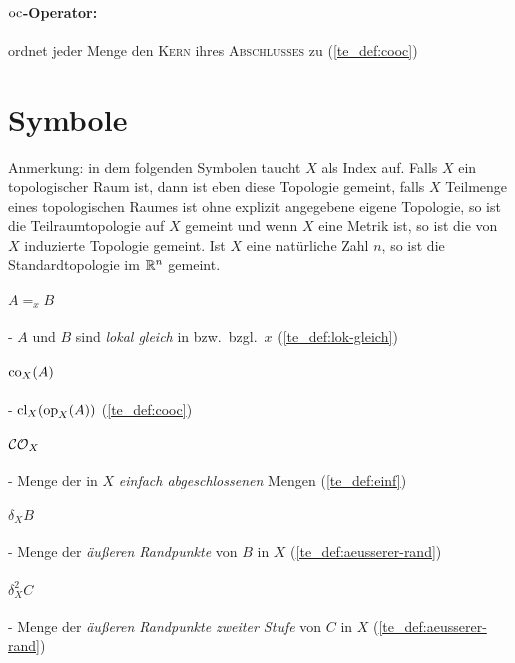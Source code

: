    \paragraph{$\text{oc}$-Operator:} ordnet jeder Menge den \textsc{Kern} ihres \textsc{Abschlusses} zu (\ref{te_def:cooc})
    
   
\section*{Symbole}

    Anmerkung: in dem folgenden Symbolen taucht $X$ als Index auf. Falls $X$ ein topologischer Raum ist, dann ist eben diese Topologie gemeint, falls $X$ Teilmenge eines topologischen Raumes ist ohne explizit angegebene eigene Topologie, so ist die Teilraumtopologie auf $X$ gemeint und wenn $X$ eine Metrik ist, so ist die von $X$ induzierte Topologie gemeint. Ist $X$ eine natürliche Zahl $n$, so ist die Standardtopologie im $\mathbb{R}^n$ gemeint.

    \paragraph{$A =_x B$} - \quad $A$ und $B$ sind \textit{lokal gleich} in bzw.\ bzgl.\ $x$  (\ref{te_def:lok-gleich})

    \paragraph{$\text{co}_X(A)$} - \quad $\text{cl}_X(\text{op}_X(A))$ (\ref{te_def:cooc})

    \paragraph{$\mathcal{CO}_X$} - \quad Menge der in $X$ \textit{einfach abgeschlossenen} Mengen (\ref{te_def:einf})

    \paragraph{$\delta_X B$} - \quad Menge der \textit{äußeren Randpunkte} von $B$ in $X$ (\ref{te_def:aeusserer-rand})
    
    \paragraph{$\delta_X^2 C$} - \quad Menge der \textit{äußeren Randpunkte zweiter Stufe} von $C$ in $X$ (\ref{te_def:aeusserer-rand})

